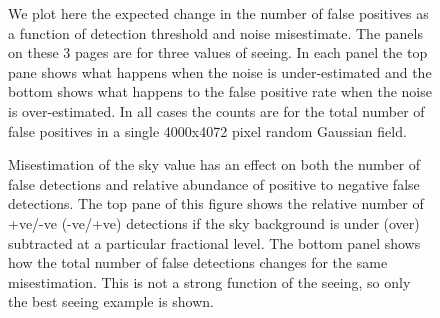 \documentclass[prd, nofootinbib, floatfix, 11pt,tightenlines,times]{article}
\begin{document}
{\begin{figure}
  \centering 
  \caption[]{ We plot here the expected change in the number of false positives
    as a function of detection threshold and noise misestimate.  The
    panels on these 3 pages are for three values of seeing.  In each panel the
    top pane shows what happens when the noise is under-estimated and
    the bottom shows what happens to the false positive rate when the
    noise is over-estimated.  In all cases the counts are for the
    total number of false positives in a single 4000x4072 pixel random
    Gaussian field.
    }
  \label{fig-fpthresh}
\end{figure}
\clearpage
\begin{figure}
  \ContinuedFloat 
  \centering 
  \caption[]{}
\end{figure} 
\clearpage
\begin{figure}
  \ContinuedFloat 
  \centering 
  \caption[]{}
\end{figure} 

\begin{figure}
\centering
{}
\caption{
Misestimation of the sky value has an effect on both the number of false detections and relative abundance of positive to negative false detections.
The top pane of this figure shows the relative number of +ve/-ve (-ve/+ve) detections if the sky background is under (over) subtracted at a particular fractional level.  The 
bottom panel shows how the total number of false detections changes for the same misestimation.  This is not a strong function of the seeing, so only the best
seeing example is shown.
}
\label{fig-skythresh}
\end{figure}

}
\end{document}
